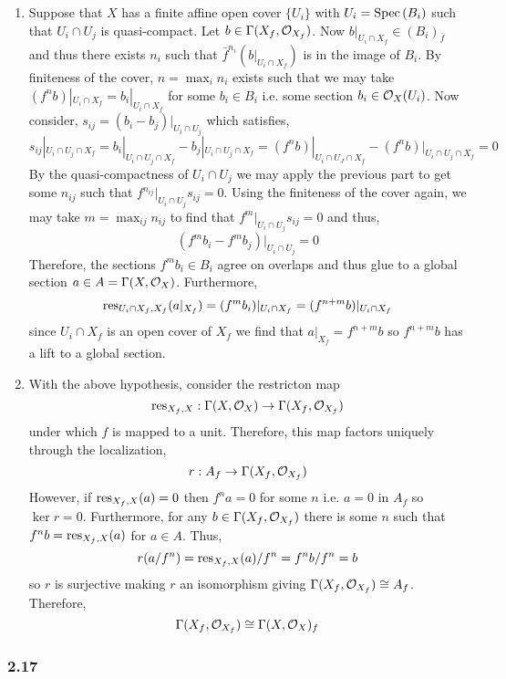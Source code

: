 \documentclass[12pt]{article}
\begin{document}
\begin{enumerate}
\item Suppose that $X$ has a finite affine open cover $\{ U_i \}$ with $U_i = \mathrm{Spec}\left( B_i \right)$ such that $U_i \cap U_j$ is quasi-compact. Let $b \in \Gamma(X_f, \mathcal{O}_{X_f})$. Now $b|_{U_i \cap X_f} \in (B_i)_{\bar{f}}$ and thus there exists $n_i$ such that $\bar{f}^{n_i}(b|_{U_i \cap X_f})$ is in the image of $B_i$. By finiteness of the cover, $n = \max_i n_i$ exists such that we may take $(f^{n} b)|_{U_i \cap X_f} = b_i |_{U_i \cap X_f}$ for some $b_i \in B_i$ i.e. some section $b_i \in \mathcal{O}_{X}(U_i)$. Now consider, $s_{ij} = (b_i - b_j)|_{U_i \cap U_j}$ which satisfies,
\[ s_{ij} |_{U_i \cap U_j \cap X_f} = b_i|_{U_i \cap U_j \cap X_f} - b_j|_{U_i \cap U_j \cap X_f} = (f^{n} b)|_{U_i \cap U_J \cap X_f} - (f^{n} b)|_{U_i \cap U_j \cap X_f} = 0 \]
By the quasi-compactness of $U_i \cap U_j$ we may apply the previous part to get some $n_{ij}$ such that $f^{n_{ij}} |_{U_i \cap U_j} s_{ij} = 0$. Using the finiteness of the cover again, we may take $m = \max_{ij} n_{ij}$ to find that $f^m |_{U_i \cap U_j} s_{ij} = 0$ and thus,
\[ (f^m b_i - f^m b_j) |_{U_i \cap U_j} = 0 \]
Therefore, the sections $f^m b_i \in B_i$ agree on overlaps and thus glue to a global section $a \in A = \Gamma(X, \mathcal{O}_{X})$. Furthermore, 
\[ \mathrm{res}_{U_i \cap X_f, X_f}(a|_{X_f}) = (f^m b_i)|_{U_i \cap X_f} = (f^{n+m} b)|_{U_i \cap X_f} \]
since $U_i \cap X_f$ is an open cover of $X_f$ we find that $a|_{X_f} = f^{n + m} b$ so $f^{n + m} b$ has a lift to a global section. 

\item With the above hypothesis, consider the restricton map 
\[ \mathrm{res}_{X_f, X} : \Gamma(X, \mathcal{O}_{X}) \to \Gamma(X_f, \mathcal{O}_{X_f}) \] 
under which $f$ is mapped to a unit. 
Therefore, this map factors uniquely through the localization, 
\[ r : A_f \to \Gamma(X_f, \mathcal{O}_{X_f}) \]
However, if $\mathrm{res}_{X_f,X}(a) = 0$ then $f^n a = 0$ for some $n$ i.e. $a = 0$ in $A_f$ so $\ker{r} = 0$. Furthermore, for any $b \in \Gamma(X_f, \mathcal{O}_{X_f})$ there is some $n$ such that $f^n b = \mathrm{res}_{X_f, X}(a)$ for $a \in A$. Thus, 
\[ r(a/f^n) = \mathrm{res}_{X_f, X}(a) / f^n = f^n b / f^n  = b \]
so $r$ is surjective making  $r$ an isomorphism giving $\Gamma(X_f, \mathcal{O}_{X_f}) \cong A_f$. Therefore,
\[ \Gamma(X_f, \mathcal{O}_{X_f}) \cong \Gamma(X, \mathcal{O}_{X})_f \]
\end{enumerate}

\subsubsection{2.17}
\end{document}
